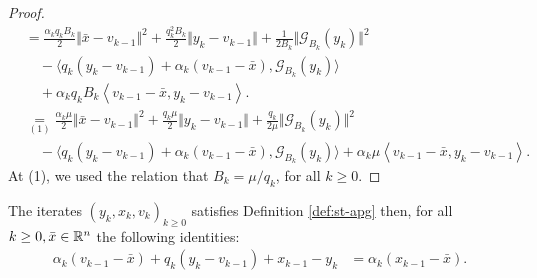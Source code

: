 \documentclass[12pt]{article}
\begin{document}
\begin{proof}
\begin{align*}
                &= 
                \frac{\alpha_k q_k B_k}{2}\Vert \bar x - v_{k - 1}\Vert^2
                + \frac{q_k^2B_k}{2}\Vert y_k - v_{k - 1} \Vert
                + \frac{1}{2B_k}\Vert \mathcal G_{B_k}(y_k)\Vert^2
                    \\ &\quad 
                    - \langle
                        q_k(y_k - v_{k - 1}) + \alpha_k(v_{k - 1} - \bar x), \mathcal G_{B_k}(y_k)
                    \rangle
                    \\ &\quad 
                    + \alpha_k q_k B_k
                    \left\langle 
                        v_{k - 1} - \bar x, 
                        y_k - v_{k - 1}
                    \right\rangle. 
                \\
                &\underset{(1)}{=} 
                \frac{\alpha_k \mu}{2}
                \Vert \bar x - v_{k - 1}\Vert^2
                + \frac{q_k\mu}{2}\Vert y_k - v_{k - 1} \Vert
                + \frac{q_k}{2\mu}\Vert \mathcal G_{B_k}(y_k)\Vert^2
                    \\ &\quad 
                - \langle
                        q_k(y_k - v_{k - 1}) + \alpha_k(v_{k - 1} - \bar x), \mathcal G_{B_k}(y_k)
                    \rangle
                    + \alpha_k \mu
                    \left\langle 
                        v_{k - 1} - \bar x, 
                        y_k - v_{k - 1}
                    \right\rangle. 
            \end{align*}
            At (1), we used the relation that $B_k = \mu/q_k$, for all $k \ge 0$. 
        \end{proof}
        \begin{lemma}\label{lemma:cnvg-prep-part2}
            The iterates $(y_k, x_k, v_k)_{k \ge 0}$ satisfies Definition \ref{def:st-apg} then, for all $k \ge 0, \bar x \in \mathbb R^n$ the following identities: 
            \begin{align*}
                \alpha_k(v_{k - 1} - \bar x) 
                + q_k(y_k - v_{k - 1})
                + x_{k - 1} - y_k
                &= 
                \alpha_k(x_{k - 1} - \bar x). 
            \end{align*}
        \end{lemma}
\end{document}
